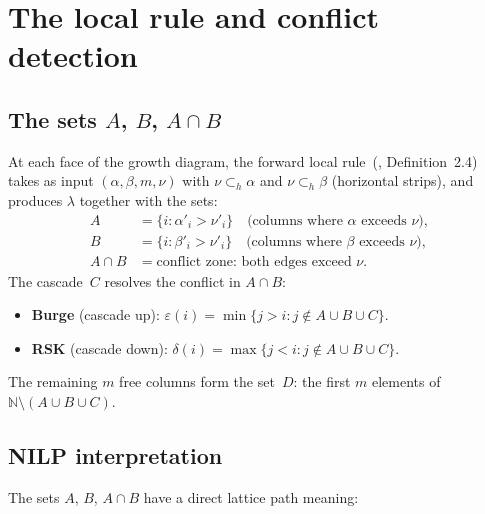 \documentclass[11pt]{article}
\newcommand{\N}{\mathbb{N}}
\theoremstyle{plain}
\theoremstyle{definition}
\begin{document}
\section{The local rule and conflict detection}
\label{sec:local-rule}

\subsection{The sets $A$, $B$, $A \cap B$}

At each face of the growth diagram, the forward local
rule~(\cite{UNDERLYING_SET}, Definition~2.4) takes as input
$(\alpha, \beta, m, \nu)$ with $\nu \subset_h \alpha$
and $\nu \subset_h \beta$ (horizontal strips), and
produces $\lambda$ together with the sets:
\begin{align}
  A &= \{i : \alpha'_i > \nu'_i\}
    \quad\text{(columns where $\alpha$ exceeds $\nu$)},
    \label{eq:A} \\
  B &= \{i : \beta'_i > \nu'_i\}
    \quad\text{(columns where $\beta$ exceeds $\nu$)},
    \label{eq:B} \\
  A \cap B &= \text{conflict zone: both edges exceed $\nu$}.
    \label{eq:AB}
\end{align}
The cascade~$C$ resolves the conflict in $A \cap B$:
\begin{itemize}
  \item \textbf{Burge} (cascade up):
    $\varepsilon(i) = \min\{j > i : j \notin A \cup B \cup C\}$.
  \item \textbf{RSK} (cascade down):
    $\delta(i) = \max\{j < i : j \notin A \cup B \cup C\}$.
\end{itemize}
The remaining $m$ free columns form the set~$D$:
the first $m$ elements of $\N \setminus (A \cup B \cup C)$.


\subsection{NILP interpretation}

The sets $A$, $B$, $A \cap B$ have a direct lattice path
meaning:
\end{document}
